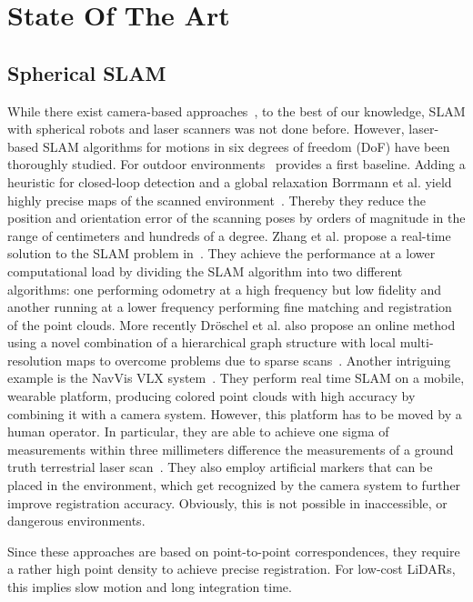 \section{State Of The Art}

\subsection{Spherical SLAM}

While there exist camera-based approaches~\cite{9233654}, to the best of our knowledge, SLAM with spherical robots and laser scanners was not done before.
However, laser-based SLAM algorithms for motions in six degrees of freedom (DoF) have been thoroughly studied.
For outdoor environments~\cite{JFR2006} provides a first baseline.
Adding a heuristic for closed-loop detection and a global relaxation Borrmann et al. yield highly precise maps of the scanned environment~\cite{RAS2007}.
Thereby they reduce the position and orientation error of the scanning poses by orders of magnitude in the range of centimeters and hundreds of a degree.
Zhang et al. propose a real-time solution to the SLAM problem in~\cite{Zhang2014}.
They achieve the performance at a lower computational load by dividing the SLAM algorithm into two different algorithms: one performing odometry at a high frequency but low fidelity and another running at a lower frequency performing fine matching and registration of the point clouds.
More recently Dröschel et al. also propose an online method using a novel combination of a hierarchical graph structure with local multi-resolution maps to overcome problems due to sparse scans~\cite{Droeschel2018}.
Another intriguing example is the NavVis VLX system~\cite{navvis}.
They perform real time SLAM on a mobile, wearable platform, producing colored point clouds with high accuracy by combining it with a camera system.
However, this platform has to be moved by a human operator. 
In particular, they are able to achieve one sigma of measurements within three millimeters difference the measurements of a ground truth terrestrial laser scan~\cite{navvisAcc}. 
They also employ artificial markers that can be placed in the environment, which get recognized by the camera system to further improve registration accuracy.
Obviously, this is not possible in inaccessible, or dangerous environments.

Since these approaches are based on point-to-point correspondences, they require a rather high point density to achieve precise registration.
For low-cost LiDARs, this implies slow motion and long integration time.

